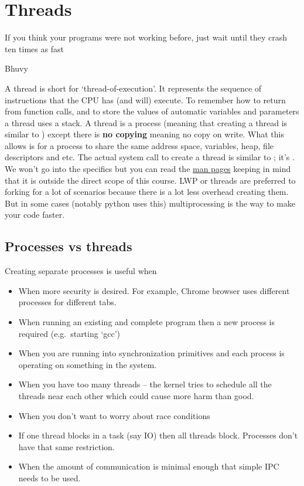 \chapter{Threads}

\epigraph{If you think your programs were not working before, just wait until they crash ten times as fast}{Bhuvy}

A thread is short for `thread-of-execution'. It represents the sequence of instructions that the CPU has (and will) execute. To remember how to return from function calls, and to store the values of automatic variables and parameters a thread uses a stack. A thread is a process (meaning that creating a thread is similar to ) except there is \textbf{no copying} meaning no copy on write. What this allows is for a process to share the same address space, variables, heap, file descriptors and etc. The actual system call to create a thread is similar to ; it's . We won't go into the specifics but you can read the \href{http://man7.org/linux/man-pages/man2/clone.2.html}{man pages} keeping in mind that it is outside the direct scope of this course. LWP or threads are preferred to forking for a lot of scenarios because there is a lot less overhead creating them. But in some cases (notably python uses this) multiprocessing is the way to make your code faster.

\section{Processes vs threads}

Creating separate processes is useful when
\begin{itemize}
\tightlist
\item When more security is desired. For example, Chrome browser uses different processes for different tabs.
\item When running an existing and complete program then a new process is required (e.g.~starting `gcc') 
\item When you are running into synchronization primitives and each process is operating on something in the system.
\item When you have too many threads -- the kernel tries to schedule all the threads near each other which could cause more harm than good.
\item When you don't want to worry about race conditions
\item If one thread blocks in a task (say IO) then all threads block. Processes don't have that same restriction.
\item When the amount of communication is minimal enough that simple IPC needs to be used.
\end{itemize}

